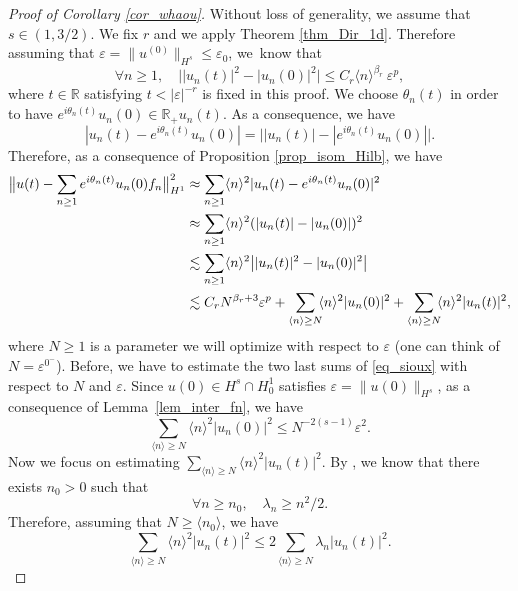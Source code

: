 \documentclass[JEP,XML,SOM,Unicode,NoEqCountersInSection,published]{cedram}
\let\epsilon\varepsilon
\theoremstyle{definition}
\begin{document}
\begin{proof}[Proof of Corollary \ref{cor_whaou}] Without loss of generality, we assume that $s\in (1,3/2)$. We fix $r$ and we apply Theorem \ref{thm_Dir_1d}. Therefore assuming that $\varepsilon=\| u^{(0)}\|_{H^s}\leq \epsilon_0$, we~know that
\[
\forall n\geq 1, \quad \big| |u_n(t)|^2 - |u_n(0)|^2 \big| \leq C_r \langle n \rangle^{\beta_r} \ \varepsilon^p,
\]
where $t\in \mathbb{R}$ satisfying $t<|\varepsilon|^{-r}$ is fixed in this proof. We choose $\theta_n(t)$ in order to have $e^{i\theta_n(t)}u_n(0) \in \mathbb{R}_+ u_n(t) $. As a consequence, we have
\[
|u_n(t) - e^{i\theta_n(t)} u_n(0)| = \bigl||u_n(t)| -| e^{i\theta_n(t)} u_n(0)| \bigr|.
\]
Therefore, as a consequence of Proposition \ref{prop_isom_Hilb}, we have
\begin{equation*}
\label{eq_sioux}
\begin{split}
\big\| u(t) - \sum_{n\geq 1} e^{i\theta_n(t)} u_n(0) f_n \big\|_{H^1}^2 &\approx \sum_{n\geq 1} \langle n \rangle^2 |u_n(t) - e^{i\theta_n(t)} u_n(0)|^2\\
&\approx \sum_{n\geq 1} \langle n \rangle^2 (|u_n(t)| - |u_n(0)|)^2 \\
&\lesssim \sum_{n\geq 1} \langle n \rangle^2 \bigl||u_n(t)|^2 - |u_n(0)|^2\bigr| \\ & \lesssim C_r N^{\beta_r+3} \varepsilon^p + \sum_{\langle n \rangle \geq N}\hspace*{-1mm} \langle n \rangle^2 |u_n(0)|^2 + \sum_{\langle n \rangle \geq N}\hspace*{-1mm} \langle n \rangle^2 |u_n(t)|^2,
\end{split}
\end{equation*}
where $N\geq 1$ is a parameter we will optimize with respect to $\varepsilon$ (one can think of $N=\varepsilon^{0^-}$). Before, we have to estimate the two last sums of \eqref{eq_sioux} with respect to $N$ and $\varepsilon$. Since $u(0) \in H^s\cap H^{1}_0$ satisfies $\varepsilon= \|u(0)\|_{H^s}$, as a consequence of Lemma~\ref{lem_inter_fn}, we have
\begin{equation}
\label{est_rem1}
\sum_{\langle n \rangle \geq N} \langle n \rangle^2 |u_n(0)|^2 \leq N^{-2(s-1)} \varepsilon^2.
\end{equation}
Now we focus on estimating $\sum_{\langle n \rangle \geq N} \langle n \rangle^2 |u_n(t)|^2$. By \cite[Th.\,4 p.\,35]{PT}, we know that there exists $n_0>0$ such that
\[
\forall n\geq n_0, \quad \lambda_n \geq n^2/2.
\]
Therefore, assuming that $N\geq \langle n_0\rangle $, we have
\[
\sum_{\langle n \rangle \geq N} \langle n \rangle^2 |u_n(t)|^2 \leq 2 \sum_{\langle n \rangle \geq N} \lambda_n |u_n(t)|^2.
\]
\end{proof}
\end{document}

